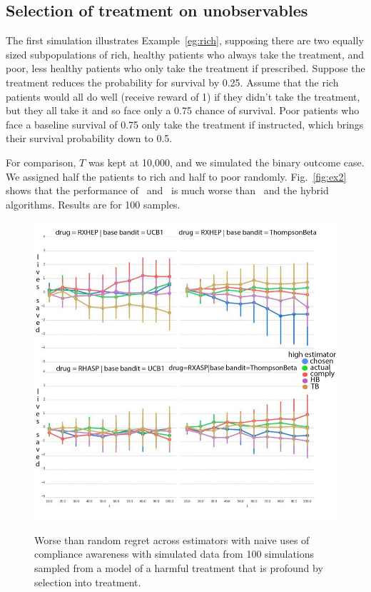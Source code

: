 \subsection{Selection of treatment on unobservables}
The first simulation illustrates Example~\eqref{eg:rich}, supposing there are two equally sized subpopulations of rich, healthy patients who always take the treatment, and poor, less healthy patients who only take the treatment if prescribed. Suppose the treatment reduces the probability for survival by 0.25. Assume that the rich patients would all do well (receive reward of 1) if they didn't take the treatment, but they all take it and so face only a 0.75 chance of survival. Poor patients who face a baseline survival of 0.75 only take the treatment if instructed, which brings their survival probability down to 0.5.

For comparison, $T$ was kept at 10,000, and we simulated the binary outcome case. We assigned half the patients to rich and half to poor randomly. Fig.~\eqref{fig:ex2} shows that the performance of \actual\, and \comply\, is much worse than \chosen\, and the hybrid algorithms. Results are for 100 samples.
%

%


\begin{figure}
	\centering	
	\includegraphics[width=1\columnwidth]{bandit/figs/ex2.jpg}\hspace{1cm}
	\label{fig:ex2}
	\caption{Worse than random regret across estimators with naive uses of compliance awareness with simulated data from 100 simulations sampled from a model of a harmful treatment that is profound by selection into treatment.}
\end{figure}



